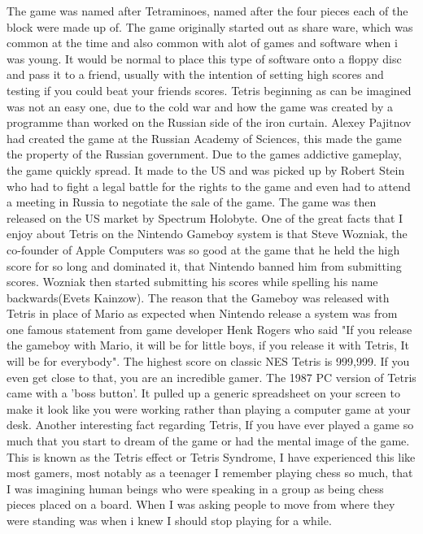 \documentclass{article}
\begin{document}
The game was named after Tetraminoes, named after the four pieces each of the block were made up of. The game originally started out as share ware, which was common at the time and also common with alot of games and software when i was young. It would be normal to place this type of software onto a floppy disc and pass it to a friend, usually with the intention of setting high scores and testing if you could beat your friends scores. \newline
Tetris beginning as can be imagined was not an easy one, due to the cold war and how the game was created by a programme than worked on the Russian side of the iron curtain. Alexey Pajitnov had created the game at the Russian Academy of Sciences, this made the game the property of the Russian government. Due to the games addictive gameplay, the game quickly spread. It made to the US and was picked up by Robert Stein who had to fight a legal battle for the rights to the game and even had to attend a meeting in Russia to negotiate the sale of the game. The game was then released on the US market by Spectrum Holobyte. \newline
One of the great facts that I enjoy about Tetris on the Nintendo Gameboy system is that Steve Wozniak, the co-founder of Apple Computers was so good at the game that he held the high score for so long and dominated it, that Nintendo banned him from submitting scores. Wozniak then started submitting his scores while spelling his name backwards(Evets Kainzow). The reason that the Gameboy was released with Tetris in place of Mario as expected when Nintendo release a system was from one famous statement from game developer Henk Rogers who said "If you release the gameboy with Mario, it will be for little boys, if you release it with Tetris, It will be for everybody". The highest score on classic NES Tetris is 999,999. If you even get close to that, you are an incredible gamer. The 1987 PC version of Tetris came with a 'boss button'. It pulled up a generic spreadsheet on your screen to make it look like you were working rather than playing a computer game at your desk. \newline
Another interesting fact regarding Tetris, If you have ever played a game so much that you start to dream of the game or had the mental image of the game. This is known as the Tetris effect or Tetris Syndrome, I have experienced this like most gamers, most notably as a teenager I remember playing chess so much, that I was imagining human beings who were speaking in a group as being chess pieces placed on a board. When I was asking people to move from where they were standing was when i knew I should stop playing for a while. \newline
\clearpage
\end{document}
